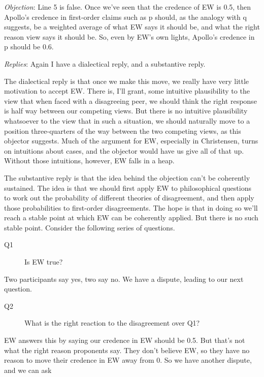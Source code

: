 \documentclass[
  11pt,
  letterpaper,
  DIV=11,
  numbers=noendperiod,
  oneside]{scrartcl}
\begin{document}
\emph{Objection}: Line 5 is false. Once we've seen that the credence of
EW is 0.5, then Apollo's credence in first-order claims such as p
should, as the analogy with q suggests, be a weighted average of what EW
says it should be, and what the right reason view says it should be. So,
even by EW's own lights, Apollo's credence in p should be 0.6.

\emph{Replies}: Again I have a dialectical reply, and a substantive
reply.

The dialectical reply is that once we make this move, we really have
very little motivation to accept EW. There is, I'll grant, some
intuitive plausibility to the view that when faced with a disagreeing
peer, we should think the right response is half way between our
competing views. But there is no intuitive plausibility whatsoever to
the view that in such a situation, we should naturally move to a
position three-quarters of the way between the two competing views, as
this objector suggests. Much of the argument for EW, especially in
Christensen, turns on intuitions about cases, and the objector would
have us give all of that up. Without those intuitions, however, EW falls
in a heap.

The substantive reply is that the idea behind the objection can't be
coherently sustained. The idea is that we should first apply EW to
philosophical questions to work out the probability of different
theories of disagreement, and then apply those probabilities to
first-order disagreements. The hope is that in doing so we'll reach a
stable point at which EW can be coherently applied. But there is no such
stable point. Consider the following series of questions.

\begin{description}
\item[Q1]
Is EW true?
\end{description}

Two participants say yes, two say no. We have a dispute, leading to our
next question.

\begin{description}
\item[Q2]
What is the right reaction to the disagreement over Q1?
\end{description}

EW answers this by saying our credence in EW should be 0.5. But that's
not what the right reason proponents say. They don't believe EW, so they
have no reason to move their credence in EW away from 0. So we have
another dispute, and we can ask
\end{document}
